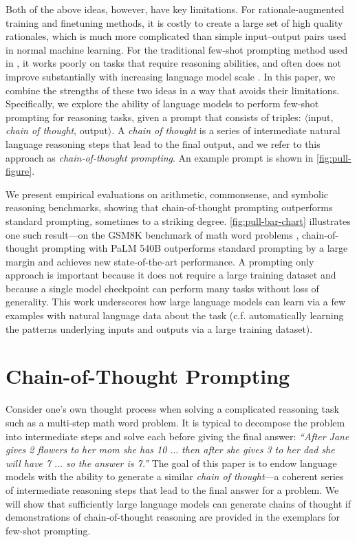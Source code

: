 Both of the above ideas, however, have key limitations. For rationale-augmented training and finetuning methods, it is costly to create a large set of high quality rationales, which is much more complicated than simple input--output pairs used in normal machine learning. For the traditional few-shot prompting method used in \citet{brown2020language}, it works poorly on tasks that require reasoning abilities, and often does not improve substantially with increasing language model scale \citep{rae2021scaling}. In this paper, we combine the strengths of these two ideas in a way that avoids their limitations. Specifically, we explore the ability of language models to perform few-shot prompting for reasoning tasks, given a prompt that consists of triples: $\langle$input, \emph{chain of thought}, output$\rangle$.
A \emph{chain of thought} is a series of intermediate natural language reasoning steps that lead to the final output, and we refer to this approach as \textit{chain-of-thought prompting}. An example prompt is shown in \ref{fig:pull-figure}. 

We present empirical evaluations on arithmetic, commonsense, and symbolic reasoning benchmarks, showing that chain-of-thought prompting outperforms standard prompting, sometimes to a striking degree.
\ref{fig:pull-bar-chart} illustrates one such result---on the GSM8K benchmark of math word problems \citep{cobbe2021training}, chain-of-thought prompting with PaLM 540B outperforms standard prompting by a large margin and achieves new state-of-the-art performance. A prompting only approach is important because it does not require a large training dataset and because a single model checkpoint can perform many tasks without loss of generality. This work underscores how large language models can learn via a few examples with natural language data about the task (c.f. automatically learning the patterns underlying inputs and outputs via a large training dataset).

\section{Chain-of-Thought Prompting} Consider one's own thought process when solving a complicated reasoning task such as a multi-step math word problem. It is typical to decompose the problem into intermediate steps and solve each before giving the final answer: \textit{``After Jane gives 2 flowers to her mom she has 10 $\ldots$ then after she gives 3 to her dad she will have 7 $\ldots$ so the answer is 7.''} The goal of this paper is to endow language models with the ability to generate a similar \textit{chain of thought}---a coherent series of intermediate reasoning steps that lead to the final answer for a problem. We will show that sufficiently large language models can generate chains of thought if demonstrations of chain-of-thought reasoning are provided in the exemplars for few-shot prompting.

